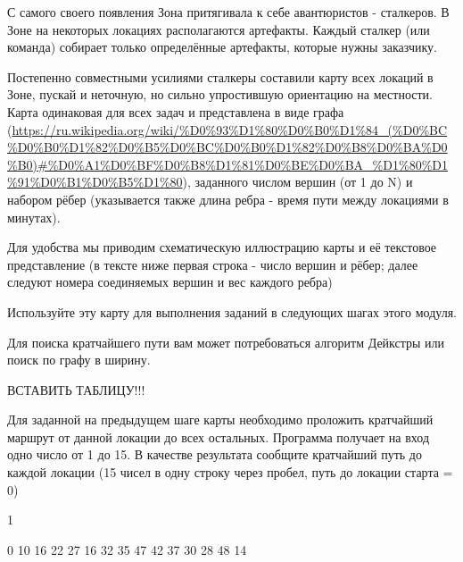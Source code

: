 С самого своего появления Зона притягивала к себе авантюристов - сталкеров. В Зоне на некоторых локациях располагаются артефакты. Каждый сталкер (или команда) собирает только определённые артефакты, которые нужны заказчику.

Постепенно совместными усилиями сталкеры составили карту всех локаций в Зоне, пускай и неточную, 
    но сильно упростившую ориентацию на местности. Карта одинаковая для всех задач и представлена в виде графа
    (\url{https://ru.wikipedia.org/wiki/%D0%93%D1%80%D0%B0%D1%84_(%D0%BC%D0%B0%D1%82%D0%B5%D0%BC%D0%B0%D1%82%D0%B8%D0%BA%D0%B0)#%D0%A1%D0%BF%D0%B8%D1%81%D0%BE%D0%BA_%D1%80%D1%91%D0%B1%D0%B5%D1%80}), заданного числом вершин (от 1 до N) и набором рёбер (указывается также длина ребра - время пути между локациями в минутах).

Для удобства мы приводим схематическую иллюстрацию карты и её текстовое представление (в тексте ниже первая строка - число вершин и рёбер; далее следуют номера соединяемых вершин и вес каждого ребра)

Используйте эту карту для выполнения заданий в следующих шагах этого модуля.

Для поиска кратчайшего пути вам может потребоваться алгоритм Дейкстры или поиск по графу в ширину.


ВСТАВИТЬ ТАБЛИЦУ!!!



Для заданной на предыдущем шаге карты необходимо проложить кратчайший маршрут от данной 
локации до всех остальных. Программа получает на вход одно число от 1 до 15. 
В качестве результата сообщите кратчайший путь до каждой локации 
(15 чисел в одну строку через пробел, путь до локации старта = 0)

\begin{myverbbox}[\small]{\vinput}
    1
\end{myverbbox}
\begin{myverbbox}[\small]{\voutput}
    0 10 16 22 27 16 32 35 47 42 37 30 28 48 14
\end{myverbbox}

